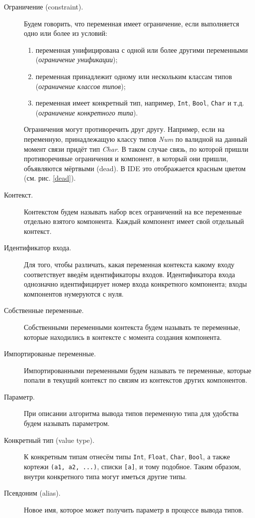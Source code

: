 \begin{description}
	\item[Ограничение (constraint).] Будем говорить, что переменная имеет ограничение, если выполняется одно или более из условий:
		\begin{enumerate}[1)]
			\item переменная унифицирована с одной или более другими переменными (\textit{ограничение унификации});
			\item переменная принадлежит одному или нескольким классам типов (\textit{ограничение классов типов});
			\item переменная имеет конкретный тип, например, \lstinline!Int!, \lstinline!Bool!, \lstinline!Char! и т.д. (\textit{ограничение конкретного типа}).
		\end{enumerate}  
	Ограничения могут противоречить друг другу. Например, если на переменную, принадлежащую классу типов \textit{Num} по валидной на данный момент связи придёт тип \textit{Char}. В таком случае связь, по которой пришли противоречивые ограничения и компонент, в который они пришли, объявляются мёртвыми (dead). В IDE это отображается красным цветом (см. рис. \ref{dead}).
	\item[Контекст.] Контекстом будем называть набор всех ограничений на все переменные отдельно взятого компонента. Каждый компонент имеет свой отдельный контекст.
	\item[Идентификатор входа.] Для того, чтобы различать, какая переменная контекста какому входу соответствует введём идентификаторы входов. Идентификатора входа однозначно идентифицирует номер входа конкретного компонента; входы компонентов нумеруются с нуля.
	\item[Собственные переменные.] Собственными переменными контекста будем называть те переменные, которые находились в контексте с момента создания компонента.
	\item[Импортированые переменные.] Импортированными переменными будем называть те переменные, которые попали в текущий контекст по связям из контекстов других компонентов.
	\item[Параметр.] При описании алгоритма вывода типов переменную типа для удобства будем называть параметром.
	\item[Конкретный тип (value type).] К конкретным типам отнесём типы \lstinline|Int|, \lstinline|Float|, \lstinline|Char|, \lstinline|Bool|, а также кортежи \lstinline|(a1, a2, ...)|, списки \lstinline|[a]|, и тому подобное. Таким образом, внутри конкретного типа могут иметься другие типы.
	\item[Псевдоним (alias).] Новое имя, которое может получить параметр в процессе вывода типов.
\end{description}


